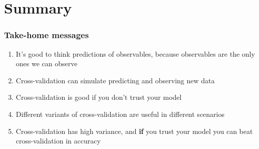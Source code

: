 \documentclass[10pt]{beamer}
\begin{document}




\section{Summary}
\frame{\sectionpage}

\begin{frame}{}

\frametitle{Take-home messages}

  \begin{enumerate}
  \item It's good to think predictions of observables, because
    observables are the only ones we can observe
  \item {}Cross-validation can simulate predicting and observing new
    data
  \item {}Cross-validation is good if you don't
    trust your model
  \item {}Different variants of cross-validation
    are useful in different scenarios
  \item {}Cross-validation has high variance, and
    {\bf if} you trust your model you can beat cross-validation in
    accuracy
  \end{enumerate}

\end{frame}



\end{document}
